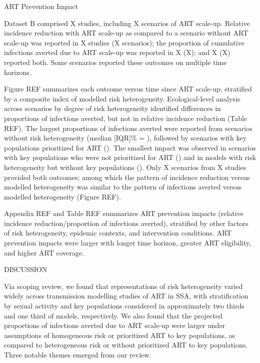 ART Prevention Impact

Dataset B comprised X studies,
including X scenarios of ART scale-up.
Relative incidence reduction with ART scale-up
as compared to a scenario without ART scale-up
was reported in X studies (X scenarios);
the proportion of cumulative infections averted due to ART scale-up
was reported in X (X);
and X (X) reported both.
Some scenarios reported these outcomes on multiple time horizons.

Figure REF summarizes each outcome versus time since ART scale-up,
stratified by a composite index of modelled risk heterogeneity.
Ecological-level analysis across scenarios by degree of risk heterogeneity
identified differences in proportions of infections averted,
but not in relative incidence reduction (Table REF).
The largest proportions of infections averted were reported from 
scenarios without risk heterogeneity (median [IQR]\% = ), followed by
scenarios with key populations prioritized for ART ().
The smallest impact was observed in scenarios with
key populations who were not prioritized for ART ()
and in models with risk heterogeneity but without key populations
().
Only X scenarios from X studies provided both outcomes; 
among which the pattern of incidence reduction versus modelled heterogeneity
was similar to the pattern of infections averted versus modelled heterogeneity
(Figure REF).

Appendix REF and Table REF summarizes
ART prevention impacts (relative incidence reduction/proportion of infections averted),
stratified by other factors of risk heterogeneity, epidemic contexts, and intervention conditions.
ART prevention impacts were larger with longer time horizon, greater ART eligibility, and higher ART coverage.

DISCUSSION

Via scoping review, we found that representations of risk heterogeneity varied widely across
transmission modelling studies of ART in SSA, with
stratification by sexual activity and key populations considered in approximately
two thirds and one third of models, respectively.
We also found that the projected proportions of infections averted due to ART scale-up were
larger under assumptions of homogeneous risk or prioritized ART to key populations,
as compared to heterogeneous risk or without prioritized ART to key populations.
Three notable themes emerged from our review.

